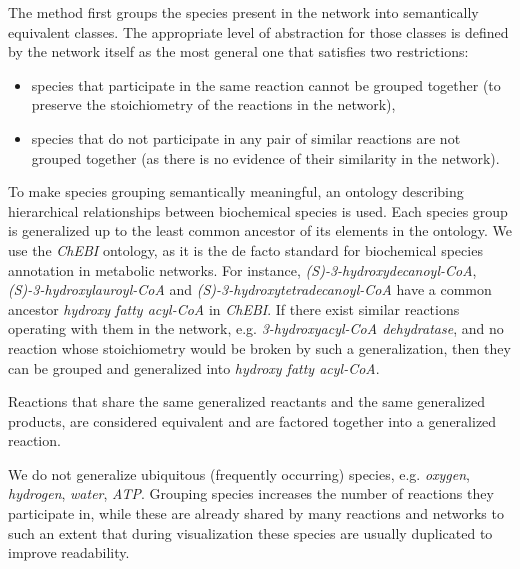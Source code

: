 \documentclass{bmcart}
\begin{document}
The method first groups the species present in the network into semantically equivalent classes. The appropriate level of abstraction for those classes is defined by the network itself as the most general one that satisfies two restrictions: 
\begin{itemize}
 \item species that participate in the same reaction cannot be grouped together (to preserve the stoichiometry of the reactions in the network),
 \item species that do not participate in any pair of similar reactions are not grouped together (as there is no evidence of their similarity in the network).
\end{itemize}
To make species grouping semantically meaningful, an ontology describing hierarchical relationships between biochemical species is used. Each species group is generalized up to the least common ancestor of its elements in the ontology. We use the \textit{ChEBI} ontology, as it is the de facto standard for biochemical species annotation in metabolic networks. %
For instance, \textit{(S)-3-hydroxydecanoyl-CoA}, \textit{(S)-3-hydroxylauroyl-CoA} and \textit{(S)-3-hydroxytetradecanoyl-CoA} have a common ancestor \textit{hydroxy fatty acyl-CoA} in \textit{ChEBI}. If there exist similar reactions operating with them in the network, e.g. \textit{3-hydroxyacyl-CoA dehydratase}, and no reaction whose stoichiometry would be broken by such a generalization, then they can be grouped and generalized into \textit{hydroxy fatty acyl-CoA}.

Reactions that share the same generalized reactants and the same generalized products, are considered equivalent and are factored together into a generalized reaction. 

We do not generalize ubiquitous (frequently occurring) species, e.g. \textit{oxygen}, \textit{hydrogen}, \textit{water}, \textit{ATP}. Grouping species increases the number of reactions they participate in, while these are already shared by many reactions and networks to such an extent that during visualization these species are usually duplicated\cite{Rohn2012} to improve readability.

\end{document}
